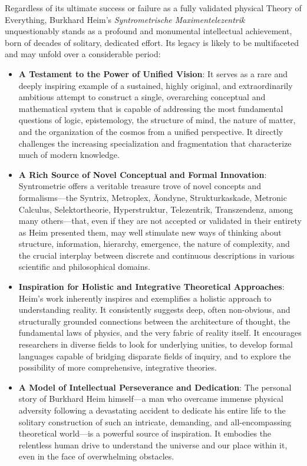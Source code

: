 \documentclass[12pt]{article}
\begin{document}
Regardless of its ultimate success or failure as a fully validated physical Theory of Everything, Burkhard Heim’s \textit{Syntrometrische Maximentelezentrik} unquestionably stands as a profound and monumental intellectual achievement, born of decades of solitary, dedicated effort. Its legacy is likely to be multifaceted and may unfold over a considerable period:
\begin{itemize}
    \item \textbf{A Testament to the Power of Unified Vision}: It serves as a rare and deeply inspiring example of a sustained, highly original, and extraordinarily ambitious attempt to construct a single, overarching conceptual and mathematical system that is capable of addressing the most fundamental questions of logic, epistemology, the structure of mind, the nature of matter, and the organization of the cosmos from a unified perspective. It directly challenges the increasing specialization and fragmentation that characterize much of modern knowledge.
    \item \textbf{A Rich Source of Novel Conceptual and Formal Innovation}: Syntrometrie offers a veritable treasure trove of novel concepts and formalisms—the Syntrix, Metroplex, Äondyne, Strukturkaskade, Metronic Calculus, Selektortheorie, Hyperstruktur, Telezentrik, Transzendenz, among many others—that, even if they are not accepted or validated in their entirety as Heim presented them, may well stimulate new ways of thinking about structure, information, hierarchy, emergence, the nature of complexity, and the crucial interplay between discrete and continuous descriptions in various scientific and philosophical domains.
    \item \textbf{Inspiration for Holistic and Integrative Theoretical Approaches}: Heim's work inherently inspires and exemplifies a holistic approach to understanding reality. It consistently suggests deep, often non-obvious, and structurally grounded connections between the architecture of thought, the fundamental laws of physics, and the very fabric of reality itself. It encourages researchers in diverse fields to look for underlying unities, to develop formal languages capable of bridging disparate fields of inquiry, and to explore the possibility of more comprehensive, integrative theories.
    \item \textbf{A Model of Intellectual Perseverance and Dedication}: The personal story of Burkhard Heim himself—a man who overcame immense physical adversity following a devastating accident to dedicate his entire life to the solitary construction of such an intricate, demanding, and all-encompassing theoretical world—is a powerful source of inspiration. It embodies the relentless human drive to understand the universe and our place within it, even in the face of overwhelming obstacles.
\end{itemize}
\end{document}
